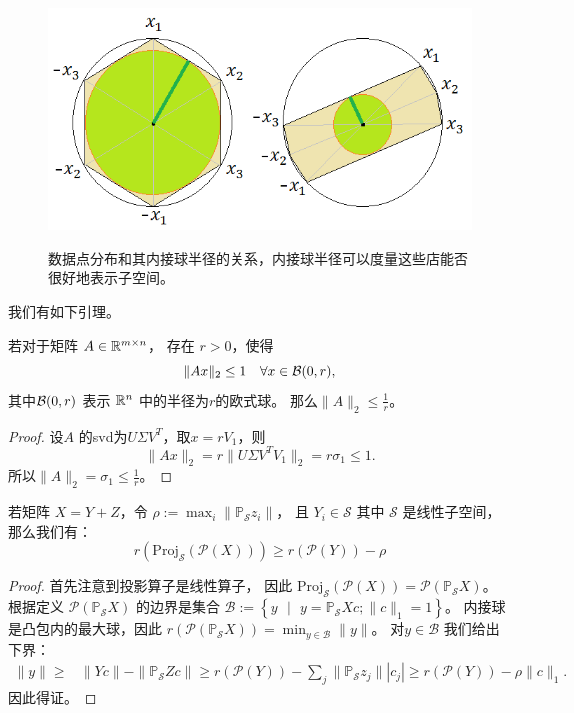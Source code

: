 \documentclass[main.tex]{subfiles}
\begin{document}
\begin{figure}
  \centering
  \includegraphics[width=0.7\linewidth]{pics/inradius.png}\\
  \caption{数据点分布和其内接球半径的关系，内接球半径可以度量这些店能否很好地表示子空间。}
  \label{fig:inradius}
\end{figure}

我们有如下引理。

\begin{lemma}\label{lemma:circum_inradius}
  若对于矩阵 $A \in \mathbb{R}^{m \times n}$， 存在 $r>0$，使得
  $$\|Ax\|_2 \leq 1 \quad \forall x \in \mathcal{B}(0, r),$$
  其中$\mathcal{B}(0, r)$ 表示 $\mathbb{R}^n$ 中的半径为$r$的欧式球。
  那么$\|A\|_2 \leq \frac{1}{r}$。
\end{lemma}
\begin{proof}
  设$A$ 的svd为$U\Sigma V^T$，取$x=rV_1$，则
  $$\|Ax\|_2 = r \|U \Sigma V^T V_1\|_2 = r \sigma_1 \leq 1.$$
  所以$\|A\|_2 = \sigma_1 \leq \frac{1}{r}$。
\end{proof}

\begin{lemma}\label{lemma:Y_containing_set}
  若矩阵 $X=Y+Z$，令 $\rho:=\max_{i}\|\mathbb{P}_\mathcal{S}z_i\|$， 且 $Y_i \in \mathcal{S}$ 其中
  $\mathcal{S}$ 是线性子空间， 那么我们有：
  \begin{equation*}
    r(\mathrm{Proj}_\mathcal{S} (\mathcal{P}(X))) \geq r(\mathcal{P}(Y)) - \rho
  \end{equation*}
\end{lemma}
\begin{proof}
  首先注意到投影算子是线性算子， 因此 $\mathrm{Proj}_\mathcal{S}(\mathcal{P}(X))=\mathcal{P}(\mathbb{P}_\mathcal{S} X)$。
  根据定义 $\mathcal{P}(\mathbb{P}_\mathcal{S} X)$ 的边界是集合 $\mathcal{B}:=
  \left\{y\text{ }|\text{ }y=\mathbb{P}_\mathcal{S} X c; \|c\|_1=1\right\}$。
  内接球是凸包内的最大球，因此 $r(\mathcal{P}(\mathbb{P}_\mathcal{S} X)) =
  \min_{y\in \mathcal{B}} \|y\|$。 对$y \in \mathcal{B} $ 我们给出下界：
  \begin{align*}
    \|y\| \geq& \|Yc\|-\|\mathbb{P}_\mathcal{S}Z c\|\geq r(\mathcal{P}(Y)) - {\sum}_j{\|\mathbb{P}_\mathcal{S}z_j}\||c_j|
    \geq r(\mathcal{P}(Y)) - \rho\|c\|_1.
  \end{align*}
  因此得证。
\end{proof}
\end{document}
